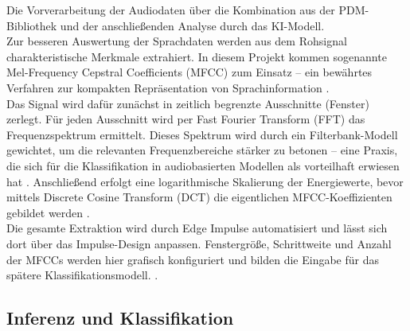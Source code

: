 Die Vorverarbeitung der Audiodaten über die Kombination aus der PDM-Bibliothek und der anschließenden Analyse durch das KI-Modell.\\
\bigskip
Zur besseren Auswertung der Sprachdaten werden aus dem Rohsignal charakteristische Merkmale extrahiert. In diesem Projekt kommen sogenannte Mel-Frequency Cepstral Coefficients (MFCC) zum Einsatz – ein bewährtes Verfahren zur kompakten Repräsentation von Sprachinformation \cite{Jurafsky:2023}.\\
\bigskip
Das Signal wird dafür zunächst in zeitlich begrenzte Ausschnitte (Fenster) zerlegt. Für jeden Ausschnitt wird per Fast Fourier Transform (FFT) das Frequenzspektrum ermittelt. Dieses Spektrum wird durch ein Filterbank-Modell gewichtet, um die relevanten Frequenzbereiche stärker zu betonen – eine Praxis, die sich für die Klassifikation in audiobasierten Modellen als vorteilhaft erwiesen hat \cite{Jurafsky:2023}. Anschließend erfolgt eine logarithmische Skalierung der Energiewerte, bevor mittels Discrete Cosine Transform (DCT) die eigentlichen MFCC-Koeffizienten gebildet werden \cite{EdgeImpulse:2025ImpulseDesign}.\\
\bigskip
Die gesamte Extraktion wird durch Edge Impulse automatisiert und lässt sich dort über das Impulse-Design anpassen. Fenstergröße, Schrittweite und Anzahl der MFCCs werden hier grafisch konfiguriert und bilden die Eingabe für das spätere Klassifikationsmodell.  \cite{EdgeImpulse:2025ImpulseDesign}.

\subsection{Inferenz und Klassifikation} \label{sec:Klassifikation}

